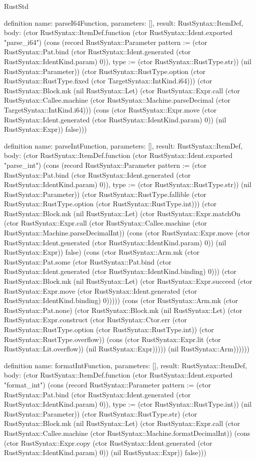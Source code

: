 \begin{lexlean}{RustStd}
\begin{semanticmodule}
definition{
  name: parseI64Function,
  parameters: [],
  result: RustSyntax::ItemDef,
  body: (ctor RustSyntax::ItemDef.function (ctor RustSyntax::Ident.exported "parse_i64") (cons (record RustSyntax::Parameter {pattern := (ctor RustSyntax::Pat.bind (ctor RustSyntax::Ident.generated (ctor RustSyntax::IdentKind.param) 0)), type := (ctor RustSyntax::RustType.str)}) (nil RustSyntax::Parameter)) (ctor RustSyntax::RustType.option (ctor RustSyntax::RustType.fixed (ctor TargetSyntax::IntKind.i64))) (ctor RustSyntax::Block.mk (nil RustSyntax::Let) (ctor RustSyntax::Expr.call (ctor RustSyntax::Callee.machine (ctor RustSyntax::Machine.parseDecimal (ctor TargetSyntax::IntKind.i64))) (cons (ctor RustSyntax::Expr.move (ctor RustSyntax::Ident.generated (ctor RustSyntax::IdentKind.param) 0)) (nil RustSyntax::Expr)) false)))
}

definition{
  name: parseIntFunction,
  parameters: [],
  result: RustSyntax::ItemDef,
  body: (ctor RustSyntax::ItemDef.function (ctor RustSyntax::Ident.exported "parse_int") (cons (record RustSyntax::Parameter {pattern := (ctor RustSyntax::Pat.bind (ctor RustSyntax::Ident.generated (ctor RustSyntax::IdentKind.param) 0)), type := (ctor RustSyntax::RustType.str)}) (nil RustSyntax::Parameter)) (ctor RustSyntax::RustType.fallible (ctor RustSyntax::RustType.option (ctor RustSyntax::RustType.int))) (ctor RustSyntax::Block.mk (nil RustSyntax::Let) (ctor RustSyntax::Expr.matchOn (ctor RustSyntax::Expr.call (ctor RustSyntax::Callee.machine (ctor RustSyntax::Machine.parseDecimalInt)) (cons (ctor RustSyntax::Expr.move (ctor RustSyntax::Ident.generated (ctor RustSyntax::IdentKind.param) 0)) (nil RustSyntax::Expr)) false) (cons (ctor RustSyntax::Arm.mk (ctor RustSyntax::Pat.some (ctor RustSyntax::Pat.bind (ctor RustSyntax::Ident.generated (ctor RustSyntax::IdentKind.binding) 0))) (ctor RustSyntax::Block.mk (nil RustSyntax::Let) (ctor RustSyntax::Expr.succeed (ctor RustSyntax::Expr.move (ctor RustSyntax::Ident.generated (ctor RustSyntax::IdentKind.binding) 0))))) (cons (ctor RustSyntax::Arm.mk (ctor RustSyntax::Pat.none) (ctor RustSyntax::Block.mk (nil RustSyntax::Let) (ctor RustSyntax::Expr.construct (ctor RustSyntax::Ctor.err (ctor RustSyntax::RustType.option (ctor RustSyntax::RustType.int)) (ctor RustSyntax::RustType.overflow)) (cons (ctor RustSyntax::Expr.lit (ctor RustSyntax::Lit.overflow)) (nil RustSyntax::Expr))))) (nil RustSyntax::Arm))))))
}

definition{
  name: formatIntFunction,
  parameters: [],
  result: RustSyntax::ItemDef,
  body: (ctor RustSyntax::ItemDef.function (ctor RustSyntax::Ident.exported "format_int") (cons (record RustSyntax::Parameter {pattern := (ctor RustSyntax::Pat.bind (ctor RustSyntax::Ident.generated (ctor RustSyntax::IdentKind.param) 0)), type := (ctor RustSyntax::RustType.int)}) (nil RustSyntax::Parameter)) (ctor RustSyntax::RustType.str) (ctor RustSyntax::Block.mk (nil RustSyntax::Let) (ctor RustSyntax::Expr.call (ctor RustSyntax::Callee.machine (ctor RustSyntax::Machine.formatDecimalInt)) (cons (ctor RustSyntax::Expr.copy (ctor RustSyntax::Ident.generated (ctor RustSyntax::IdentKind.param) 0)) (nil RustSyntax::Expr)) false)))
}


\end{semanticmodule}
\end{lexlean}
